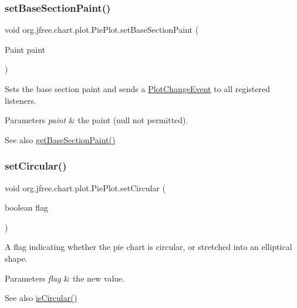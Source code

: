 \subsubsection{\texorpdfstring{set\+Base\+Section\+Paint()}{setBaseSectionPaint()}}
{\footnotesize\ttfamily void org.\+jfree.\+chart.\+plot.\+Pie\+Plot.\+set\+Base\+Section\+Paint (\begin{DoxyParamCaption}\item[{Paint}]{paint }\end{DoxyParamCaption})}

Sets the base section paint and sends a \mbox{\hyperlink{}{Plot\+Change\+Event}} to all registered listeners.


\begin{DoxyParams}{Parameters}
{\em paint} & the paint ({\ttfamily null} not permitted).\\
\hline
\end{DoxyParams}
\begin{DoxySeeAlso}{See also}
\mbox{\hyperlink{classorg_1_1jfree_1_1chart_1_1plot_1_1_pie_plot_a3f62bcd5bca8122fa099f9607f75d93a}{get\+Base\+Section\+Paint()}} 
\end{DoxySeeAlso}
\mbox{\label{classorg_1_1jfree_1_1chart_1_1plot_1_1_pie_plot_ad604c65dd48135bbdfe7472dac9c5198}} 
\subsubsection{\texorpdfstring{set\+Circular()}{setCircular()}\hspace{0.1cm}{\footnotesize\ttfamily [1/2]}}
{\footnotesize\ttfamily void org.\+jfree.\+chart.\+plot.\+Pie\+Plot.\+set\+Circular (\begin{DoxyParamCaption}\item[{boolean}]{flag }\end{DoxyParamCaption})}

A flag indicating whether the pie chart is circular, or stretched into an elliptical shape.


\begin{DoxyParams}{Parameters}
{\em flag} & the new value.\\
\hline
\end{DoxyParams}
\begin{DoxySeeAlso}{See also}
\mbox{\hyperlink{classorg_1_1jfree_1_1chart_1_1plot_1_1_pie_plot_aa2b4ed17a7951f9b1fa4ca48c78a259b}{is\+Circular()}} 
\end{DoxySeeAlso}
\mbox{\label{classorg_1_1jfree_1_1chart_1_1plot_1_1_pie_plot_af99bccb2661acdecf5f3725f35b7dcb3}} 
